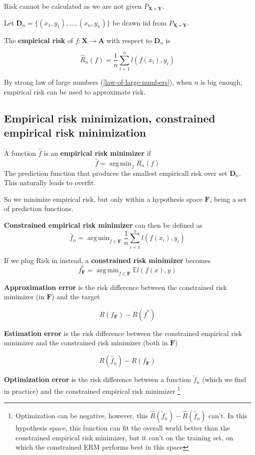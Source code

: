 \documentclass{article}
\DeclareMathOperator*{\argmin}{arg\,min}
\begin{document}
Risk cannot be calculated as we are not given $P_{\mathbf{X} \times \mathbf{Y}}$.

Let $\mathbf{D}_n = \{(x_1, y_1), \dots, (x_n, y_n)\}$ be drawn iid from $P_{\mathbf{X} \times \mathbf{Y}}$.

The \textbf{empirical risk} of $f : \mathbf{X} \to \mathbf{A}$ with respect to $\mathbf{D}_n$ is

$$
\hat{R}_n(f) = \frac{1}{n} \sum_{i = 1}^{n}{\mathit{l}(f(x_i), y_i)}
$$

By strong law of large numbers (\ref{law-of-large-numbers}), when $n$ is big enough, empirical risk can be used to approximate risk.

\subsection{Empirical risk minimization, constrained empirical risk minimization}

A function $\hat{f}$ is an \textbf{empirical risk minimizer} if
$$
\hat{f} = \argmin_{f}{\hat{R}_n(f)}
$$
The prediction function that produces the smallest empiricall risk over set $\mathbf{D}_n$.
This naturally leads to overfit.

So we minimize empirical risk, but only within a hypothesis space $\mathbf{F}$, being a set of prediction functions.

\textbf{Constrained empirical risk minimizer} can then be defined as
$$
\hat{f}_n = \argmin_{f \in \mathbf{F}}{\frac{1}{n} \sum_{i = 1}^{n}{\mathit{l}(f(x_i), y_i)}}
$$

If we plug Risk in instead, a \textbf{constrained risk minimizer} becomes
$$
f^*_{\mathbf{F}} = \argmin_{f \in \mathbf{F}}{\mathbb{E}\mathit{l}(f(x), y)}
$$

\textbf{Approximation error} is the risk difference between the constrained risk minimizer (in $\mathbf{F}$) and the target

$$
R(f_{\mathbf{F}}) - R(f^*)
$$

\textbf{Estimation error} is the risk difference between the constrained empirical risk minimizer and the constrained risk minimizer (both in $\mathbf{F}$)

$$
R(\hat{f}_n) - R(f_{\mathbf{F}})
$$

\textbf{Optimization error} is the risk difference between a function $\tilde{f}_n$ (which we find in practice) and the constrained empirical risk minimizer
\footnote{Optimization can be negative, however, this $\hat{R}(\tilde{f}_n) - \hat{R}(\hat{f}_n)$ can't.
In this hypothesis space, this function can fit the overall world better than the constrained empirical risk minimizer, but it can't on the training set, on which the constrained ERM performs best in this space}
\end{document}
